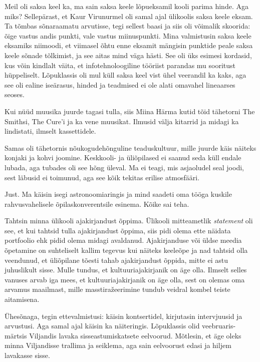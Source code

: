 Meil oli saksa keel ka, ma sain saksa keele lõpueksamil kooli parima hinde. 
Aga miks? Sellepärast, et Kaur Virunurmel oli samal 
ajal ülikoolis saksa keele eksam. Ta tõmbas sõnaraamatu arvutisse, tegi sellest baasi ja siis oli 
võimalik skoorida: õige vastus andis punkti, vale vastus miinuspunkti. Mina 
valmistusin saksa keele eksamiks niimoodi, et viimasel õhtu enne eksamit mängisin punktide peale saksa keele sõnade tõlkimist, ja 
see aitas mind väga hästi. See oli üks esimesi kordasid, kus 
võin kindlalt väita, et infotehnoloogiline tööriist parandas mu sooritust 
hüppeliselt. Lõpuklassis oli mul küll saksa keel vist ühel veerandil ka kaks, aga 
see oli ealine iseärasus, hinded ja teadmised ei ole alati 
omavahel lineaarses seoses.

Kui nüüd muusika juurde tagasi tulla, siis Miina Härma  kutid tõid tähetorni
The Smithsi, The Cure'i ja 
ka vene muusikat. Ilmusid välja kitarrid ja 
midagi ka lindistati, ilmselt kassettidele. 

Samas oli tähetornis nõukogudehõnguline teaduskultuur, mille juurde 
käis näiteks konjaki ja kohvi joomine. Keskkooli- ja 
üliõpilased ei saanud seda küll endale lubada, aga tubades oli see hõng üleval. Ma ei 
teagi, mis asjaoludel seal joodi, sest läbusid 
ei toimunud, aga see kõik tekitas erilise atmosfääri.


Just. Ma käisin isegi astronoomiaringis ja mind saadeti 
oma tööga kuskile rahvusvahelisele
õpilaskonverentsile esinema. Kõike sai teha.


Tahtsin minna ülikooli ajakirjandust õppima. Ülikooli mitteametlik \emph{statement} oli see, 
et kui tahtsid tulla ajakirjandust õppima, siis pidi olema ette näidata portfoolio ehk
pidid olema midagi avaldanud. Ajakirjanduse või üldse meedia õpetamine on 
suhteliselt kallim tegevus kui näiteks keeleõpe ja nad tahtsid olla veendunud, et üliõpilane tõesti tahab ajakirjandust õppida, mitte ei astu 
juhuslikult sisse. Mulle tundus, et kultuuriajakirjanik on äge olla. Ilmselt selles vanuses 
arvab iga mees, et kultuuriajakirjanik on äge olla, sest on olemas oma arvamus maailmast, mille masstiražeerimine tundub 
veidral kombel teiste aitamisena.

Ühesõnaga, tegin ettevalmistusi: käisin 
kontsertidel, kirjutasin intervjuusid ja arvustusi. 
Aga samal ajal käisin ka näiteringis. Lõpuklassis olid veebruaris-märtsis 
Viljandis lavaka sisseastumiskatsete 
eelvoorud. Mõtlesin, et äge oleks minna Viljandisse trallima ja 
seiklema, aga sain eelvoorust edasi ja hiljem lavakasse sisse.

